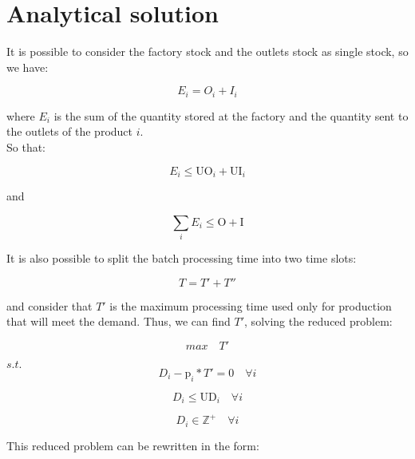 \documentclass[preprint,12pt,authoryear]{elsarticle}
\begin{document}
\section{Analytical solution}
\label{sec:analyticalSol}

It is possible to consider the factory stock and the outlets stock as single stock, so we have:

\begin{equation}
E_i = O_i + I_i
\end{equation}

where $E_i$ is the sum of the quantity stored at the factory and the quantity sent to the outlets of the product $i$. \\

So that:

\begin{equation}
E_i \leq \textrm{UO}_i + \textrm{UI}_i
\end{equation}

and

\begin{equation}
\sum_i {E_i} \leq \textrm{O} + \textrm{I}
\end{equation}


It is also possible to split the batch processing time into two time slots:

\begin{equation}
T = T' + T''
\end{equation}

and consider that $T'$ is the maximum processing time used only for production that will meet the demand. Thus, we can find $T'$, solving the reduced problem:


\begin{equation}
max \quad T'
\end{equation}

$s.t.$ \\

\begin{equation}
D_i - \textrm{p}_i * T'  = 0 \quad \forall i
\end{equation}

\begin{equation}
D_i \leq \textrm{UD}_i \quad \forall i
\end{equation}

\begin{equation}
D_i \in  \mathbb{Z}^+ \quad \forall i
\end{equation}

This reduced problem can be rewritten in the form:
\end{document}
